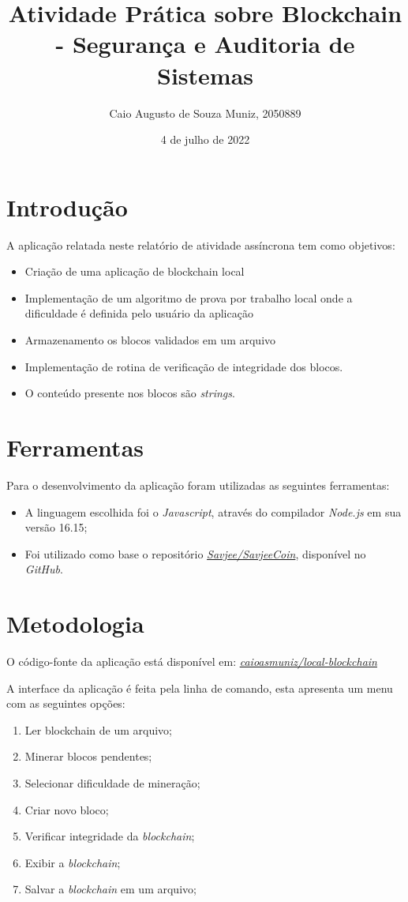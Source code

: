 \documentclass{article}
\title{Atividade Prática sobre Blockchain - Segurança e Auditoria de Sistemas}
\author{Caio Augusto de Souza Muniz, 2050889}
\date{4 de julho de 2022}
\begin{document}
\maketitle

\section{Introdução}
A aplicação relatada neste relatório de atividade assíncrona tem como objetivos:
\begin{itemize}
    \item Criação de uma aplicação de blockchain local
    \item Implementação de um algoritmo de prova por trabalho local onde a dificuldade é definida pelo usuário da aplicação
    \item Armazenamento os blocos validados em um arquivo
    \item Implementação de rotina de verificação de integridade dos blocos.
    \item O conteúdo presente nos blocos são \textit{strings}.
\end{itemize}
\section{Ferramentas}
Para o desenvolvimento da aplicação foram utilizadas as seguintes ferramentas:
\begin{itemize}
    \item A linguagem escolhida foi o \textit{Javascript}, através do compilador \textit{Node.js} em sua versão 16.15;
    \item Foi utilizado como base o repositório \href{https://github.com/Savjee/SavjeeCoin}{\textit{Savjee/SavjeeCoin}}, disponível no \textit{GitHub}.
\end{itemize}
\section{Metodologia}
O código-fonte da aplicação está disponível em: \href{https://github.com/caioasmuniz/local-blockchain}{\textit{caioasmuniz/local-blockchain}}

A interface da aplicação é feita pela linha de comando, esta apresenta um menu com as seguintes opções:
\begin{enumerate}
    \item Ler blockchain de um arquivo;
    \item Minerar blocos pendentes;
    \item Selecionar dificuldade de mineração;
    \item Criar novo bloco;
\item Verificar integridade da \textit{blockchain};
\item Exibir a \textit{blockchain};
\item Salvar a \textit{blockchain} em um arquivo;
\end{enumerate}
\end{document}
